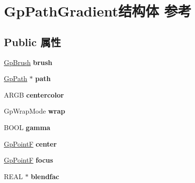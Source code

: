 \hypertarget{struct_gp_path_gradient}{}\section{Gp\+Path\+Gradient结构体 参考}
\label{struct_gp_path_gradient}
\subsection*{Public 属性}
\begin{DoxyCompactItemize}
\item 
\mbox{\label{struct_gp_path_gradient_aaefa840cb4a98625131702baba523014}} 
\hyperlink{struct_gp_brush}{Gp\+Brush} {\bfseries brush}
\item 
\mbox{\label{struct_gp_path_gradient_a4a84651b8793a664b6b675c6ae2a7b87}} 
\hyperlink{struct_gp_path}{Gp\+Path} $\ast$ {\bfseries path}
\item 
\mbox{\label{struct_gp_path_gradient_a35a13b536086f5a483aec6614228722b}} 
A\+R\+GB {\bfseries centercolor}
\item 
\mbox{\label{struct_gp_path_gradient_a0d42865018416b5681deaf05f55e3894}} 
Gp\+Wrap\+Mode {\bfseries wrap}
\item 
\mbox{\label{struct_gp_path_gradient_a8324806e85d490c6db81c4d077419276}} 
B\+O\+OL {\bfseries gamma}
\item 
\mbox{\label{struct_gp_path_gradient_ab8399a58d91d43d557c9e833a2a749ba}} 
\hyperlink{struct_point_f}{Gp\+PointF} {\bfseries center}
\item 
\mbox{\label{struct_gp_path_gradient_aaa592fe7e4050d79070b102fb0199de9}} 
\hyperlink{struct_point_f}{Gp\+PointF} {\bfseries focus}
\item 
\mbox{\label{struct_gp_path_gradient_aead44f6090d654e8cfe4a1a00e988fe6}} 
R\+E\+AL $\ast$ {\bfseries blendfac}
\item 
\mbox{\label{struct_gp_path_gradient_a04e03e4a71f74b4ae8add5b04809cc4c}} 

\end{DoxyCompactItemize}

